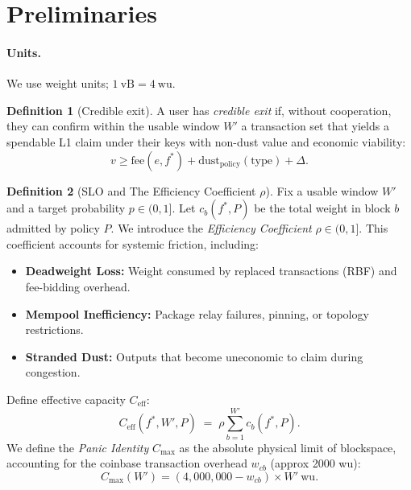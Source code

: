 \documentclass{article}
\theoremstyle{definition}
\newtheorem{definition}{Definition}
\begin{document}
\section{Preliminaries}
\paragraph{Units.} We use weight units; $1~\mathrm{vB} = 4~\mathrm{wu}$.

\begin{definition}[Credible exit]
A user has \emph{credible exit} if, without cooperation, they can confirm within the usable window $W'$ a transaction set that yields a spendable L1 claim under their keys with non-dust value and economic viability:
\small
\begin{equation*}
v \ge \mathrm{fee}(e,f^*) + \mathrm{dust}_{\mathrm{policy}}(\mathrm{type}) + \Delta.
\end{equation*}
\normalsize
\end{definition}

\begin{definition}[SLO and The Efficiency Coefficient $\rho$]
Fix a usable window $W'$ and a target probability $p \in (0,1]$. Let $c_b(f^*,P)$ be the total weight in block $b$ admitted by policy $P$.
We introduce the \emph{Efficiency Coefficient} $\rho \in (0,1]$. This coefficient accounts for systemic friction, including:
\begin{itemize}
    \itemsep0em
    \item \textbf{Deadweight Loss:} Weight consumed by replaced transactions (RBF) and fee-bidding overhead.
    \item \textbf{Mempool Inefficiency:} Package relay failures, pinning, or topology restrictions.
    \item \textbf{Stranded Dust:} Outputs that become uneconomic to claim during congestion.
\end{itemize}
Define effective capacity $C_{\mathrm{eff}}$:
\small
\begin{equation*}
C_{\mathrm{eff}}(f^*, W', P) \;=\; \rho \sum_{b=1}^{W'} c_b(f^*,P).
\end{equation*}
\normalsize
We define the \emph{Panic Identity} $C_{\max}$ as the absolute physical limit of blockspace, accounting for the coinbase transaction overhead $w_{cb}$ (approx 2000 wu):
\small
\begin{equation*}
C_{\max}(W') = (4{,}000{,}000 - w_{cb}) \times W'~\mathrm{wu}.
\end{equation*}
\normalsize
\end{definition}
\end{document}
